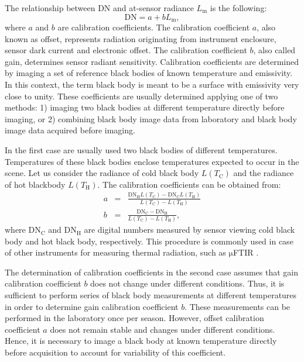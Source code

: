 The relationship between DN and at-sensor radiance $L_\mathrm{m}$ is the following:
$$ \mathrm{DN} = a + b L_\mathrm{m}, $$
where $a$ and $b$ are calibration coefficients. The calibration coefficient $a$, also known as offset, represents radiation originating from instrument enclosure, sensor dark current and electronic offset. The calibration coefficient $b$, also called gain, determines sensor radiant sensitivity. Calibration coefficients are determined by imaging a set of reference black bodies of known temperature and emissivity. In this context, the term black body is meant to be a surface with emissivity very close to unity. These coefficients are usually determined applying one of two methods: 1) imaging two black bodies at different temperature directly before imaging, or 2) combining black body image data from laboratory and black body image data acquired before imaging.

In the first case are usually used two black bodies of different temperatures. Temperatures of these black bodies enclose temperatures expected to occur in the scene. Let us consider the radiance of cold black body $L(T_\mathrm{C})$ and the radiance of hot blackbody $L(T_\mathrm{H})$. The calibration coefficients can be obtained from:
\begin{eqnarray*}
	a &=& \frac{\mathrm{DN}_\mathrm{H} L(T_\mathrm{C}) - \mathrm{DN}_\mathrm{C} L(T_\mathrm{H}) }{ L(T_\mathrm{C}) - L(T_\mathrm{H}) } \\
	b &=& \frac{\mathrm{DN}_\mathrm{C} - \mathrm{DN}_\mathrm{H}}{ L(T_\mathrm{C}) - L(T_\mathrm{H}) },
\end{eqnarray*}
where $\mathrm{DN}_\mathrm{C}$ and $\mathrm{DN}_\mathrm{H}$ are digital numbers measured by sensor viewing cold black body and hot black body, respectively. This procedure is commonly used in case of other instruments for measuring thermal radiation, such as $\mathrm{\mu}$FTIR \cite{HK96}.

\newpage
The determination of calibration coefficients in the second case assumes that gain calibration coefficient $b$ does not change under different conditions. Thus, it is sufficient to perform series of black body measurements at different temperatures in order to determine gain calibration coefficient $b$. These measurements can be performed in the laboratory once per season. However, offset calibration coefficient $a$ does not remain stable and changes under different conditions. Hence, it is necessary to image a black body at known temperature directly before acquisition to account for variability of this coefficient.


